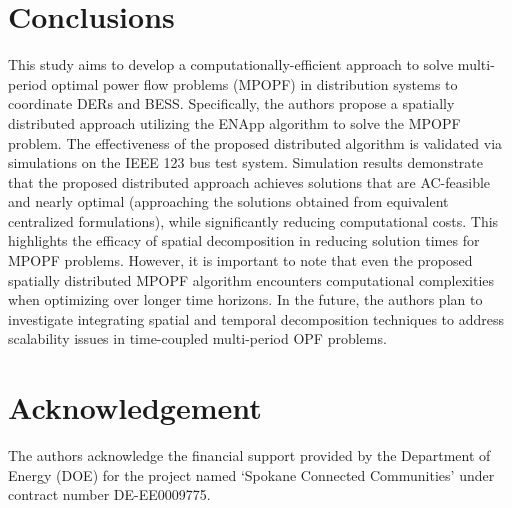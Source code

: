 \documentclass{article}
\begin{document}
\section{Conclusions}
This study aims to develop a computationally-efficient approach to solve multi-period optimal power flow problems (MPOPF) in distribution systems to coordinate DERs and BESS. Specifically, the authors propose a spatially distributed approach utilizing the ENApp algorithm to solve the MPOPF problem. The effectiveness of the proposed distributed algorithm is validated via simulations on the IEEE 123 bus test system. Simulation results demonstrate that the proposed distributed approach achieves solutions that are AC-feasible and nearly optimal (approaching the solutions obtained from equivalent centralized formulations), while significantly reducing computational costs. This highlights the efficacy of spatial decomposition in reducing solution times for MPOPF problems. However, it is important to note that even the proposed spatially distributed MPOPF algorithm encounters computational complexities when optimizing over longer time horizons. In the future, the authors plan to investigate integrating spatial and temporal decomposition techniques to address scalability issues in time-coupled multi-period OPF problems.


\section{Acknowledgement}
The authors acknowledge the financial support provided by the Department of Energy (DOE)  for the project named `Spokane Connected Communities' under contract number DE-EE0009775. 
\end{document}
